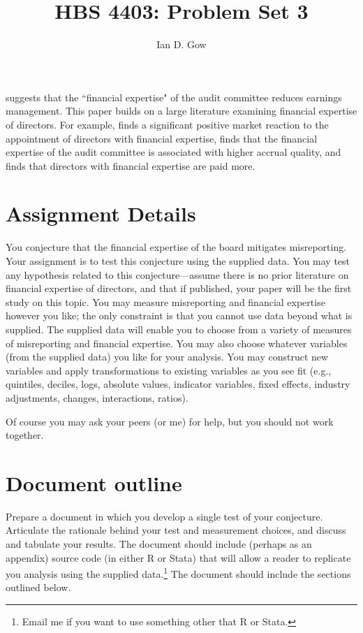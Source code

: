 \documentclass[11pt]{amsart}
\title[HBS 4403: Management Control and Performance Measurement]{HBS 4403: Problem Set 3}
\author{Ian D. Gow}
\theoremstyle{definition}
\theoremstyle{question}
\begin{document}
\usetikzlibrary{automata, shapes, calc, positioning}
\maketitle




\citet{Badolato:2014bw} suggests that the ``financial expertise" of the audit committee reduces earnings management. 
This paper builds on a large literature examining financial expertise of directors.
For example, \citet{DeFond:2005hs} finds a significant positive market reaction to the appointment of directors with financial expertise, \citet{Dhaliwal:2010bz} finds that the financial expertise of the audit committee is associated with higher accrual quality, and \citet{Engel:2010kv} finds that directors with financial expertise are paid more.

\section{Assignment Details}
You conjecture that the financial expertise of the board mitigates misreporting. 
Your assignment is to test this conjecture using the supplied data. 
You may test any hypothesis related to this conjecture---assume there is no prior literature on financial expertise of directors, and that if published, your paper will be the first study on this topic.
You may measure misreporting and financial expertise however you like; the only constraint is that you cannot use data beyond what is supplied. 
The supplied data will enable you to choose from a variety of measures of misreporting and financial expertise. 
You may also choose whatever variables (from the supplied data) you like for your analysis. 
You may construct new variables and apply transformations to existing variables as you see fit (e.g., quintiles, deciles, logs, absolute values, indicator variables, fixed effects, industry adjustments, changes, interactions, ratios). 

Of course you may ask your peers (or me) for help, but you should not work together.

\section{Document outline}
Prepare a document in which you develop a single test of your conjecture. 
Articulate the rationale behind your test and measurement choices, and discuss and tabulate your results. 
The document should include (perhaps as an appendix) source code (in either R or Stata) that will allow a reader to replicate you analysis using the supplied data.\footnote{Email me if you want to use something other that R or Stata.}
The document should include the sections outlined below.
\end{document}
